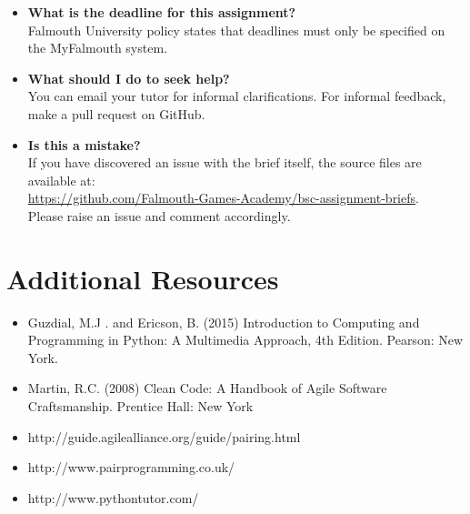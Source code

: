 \documentclass{../../fal_assignment}
\begin{document}
\begin{itemize}
	\item 	\textbf{What is the deadline for this assignment?} \\ 
    		Falmouth University policy states that deadlines must only be specified on the MyFalmouth system.
    		
	\item 	\textbf{What should I do to seek help?} \\ 
    		You can email your tutor for informal clarifications. For informal feedback, make a pull request on GitHub. 
    		
    	\item 	\textbf{Is this a mistake?} \\ 	
    		If you have discovered an issue with the brief itself, the source files are available at: \\
    		\url{https://github.com/Falmouth-Games-Academy/bsc-assignment-briefs}.\\
    		 Please raise an issue and comment accordingly.
\end{itemize}

\section*{Additional Resources}

\begin{itemize}
    \item Guzdial, M.J . and Ericson, B. (2015) Introduction to Computing and Programming in Python: A Multimedia Approach, 4th Edition. Pearson: New York.
    \item Martin, R.C. (2008) Clean Code: A Handbook of Agile Software Craftsmanship. Prentice Hall: New York
    \item http://guide.agilealliance.org/guide/pairing.html
    \item http://www.pairprogramming.co.uk/
    \item http://www.pythontutor.com/
\end{itemize}
\end{document}
